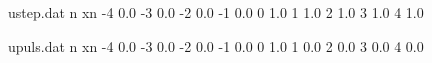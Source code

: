 
\begin{filecontents}{ustep.dat}
	n   xn 
	-4   0.0
	-3   0.0 
	-2   0.0  
	-1   0.0  
	0    1.0  
	1    1.0  
	2    1.0  
	3    1.0  
	4    1.0 
\end{filecontents}

\begin{filecontents}{upuls.dat}
	n   xn 
	-4   0.0
	-3   0.0 
	-2   0.0  
	-1   0.0  
	0    1.0  
	1    0.0  
	2    0.0  
	3    0.0  
	4    0.0 
\end{filecontents}